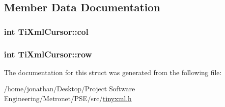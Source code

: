 \subsection{Member Data Documentation}
\subsubsection[{\texorpdfstring{col}{col}}]{\setlength{\rightskip}{0pt plus 5cm}int Ti\+Xml\+Cursor\+::col}\hypertarget{struct_ti_xml_cursor_a5694d7ed2c4d20109d350c14c417969d}{}\label{struct_ti_xml_cursor_a5694d7ed2c4d20109d350c14c417969d}
\subsubsection[{\texorpdfstring{row}{row}}]{\setlength{\rightskip}{0pt plus 5cm}int Ti\+Xml\+Cursor\+::row}\hypertarget{struct_ti_xml_cursor_a5b54dd949820c2db061e2be41f3effb3}{}\label{struct_ti_xml_cursor_a5b54dd949820c2db061e2be41f3effb3}


The documentation for this struct was generated from the following file\+:\begin{DoxyCompactItemize}
\item 
/home/jonathan/\+Desktop/\+Project Software Engineering/\+Metronet/\+P\+S\+E/src/\hyperlink{tinyxml_8h}{tinyxml.\+h}\end{DoxyCompactItemize}
